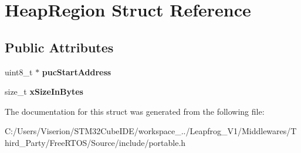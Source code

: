 \hypertarget{struct_heap_region}{}\section{Heap\+Region Struct Reference}
\label{struct_heap_region}
\subsection*{Public Attributes}
\begin{DoxyCompactItemize}
\item 
\mbox{\label{struct_heap_region_aab323508c34642ebfb884a68441d97fc}} 
uint8\+\_\+t $\ast$ {\bfseries puc\+Start\+Address}
\item 
\mbox{\label{struct_heap_region_a5933b0fd422e70a92ceef839b89a757f}} 
size\+\_\+t {\bfseries x\+Size\+In\+Bytes}
\end{DoxyCompactItemize}


The documentation for this struct was generated from the following file\+:\begin{DoxyCompactItemize}
\item 
C\+:/\+Users/\+Viserion/\+S\+T\+M32\+Cube\+I\+D\+E/workspace\+\_../\+Leapfrog\+\_\+\+V1/\+Middlewares/\+Third\+\_\+\+Party/\+Free\+R\+T\+O\+S/\+Source/include/portable.\+h\end{DoxyCompactItemize}
